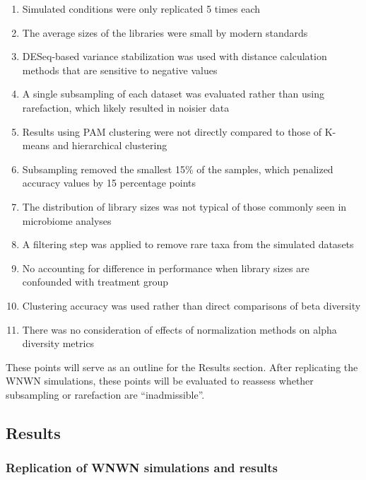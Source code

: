\documentclass[
]{article}
\providecommand{\tightlist}{%
  \setlength{\itemsep}{0pt}\setlength{\parskip}{0pt}}
\begin{document}
\begin{enumerate}
\def\labelenumi{\arabic{enumi}.}
\tightlist
\item
  Simulated conditions were only replicated 5 times each
\item
  The average sizes of the libraries were small by modern standards
\item
  DESeq-based variance stabilization was used with distance calculation
  methods that are sensitive to negative values
\item
  A single subsampling of each dataset was evaluated rather than using
  rarefaction, which likely resulted in noisier data
\item
  Results using PAM clustering were not directly compared to those of
  K-means and hierarchical clustering
\item
  Subsampling removed the smallest 15\% of the samples, which penalized
  accuracy values by 15 percentage points
\item
  The distribution of library sizes was not typical of those commonly
  seen in microbiome analyses
\item
  A filtering step was applied to remove rare taxa from the simulated
  datasets
\item
  No accounting for difference in performance when library sizes are
  confounded with treatment group
\item
  Clustering accuracy was used rather than direct comparisons of beta
  diversity
\item
  There was no consideration of effects of normalization methods on
  alpha diversity metrics
\end{enumerate}

These points will serve as an outline for the Results section. After
replicating the WNWN simulations, these points will be evaluated to
reassess whether subsampling or rarefaction are ``inadmissible''.

\hypertarget{results}{%
\subsection{Results}\label{results}}

\hypertarget{replication-of-wnwn-simulations-and-results}{%
\subsubsection{Replication of WNWN simulations and
results}\label{replication-of-wnwn-simulations-and-results}}
\end{document}
